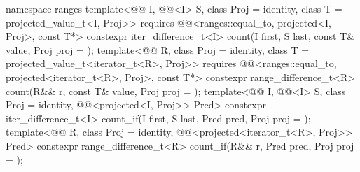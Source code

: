 \begin{codeblock}
{  namespace ranges {
    template<@@ I, @@<I> S, class Proj = identity,
             class T = projected_value_t<I, Proj>>
      requires @@<ranges::equal_to, projected<I, Proj>, const T*>
      constexpr iter_difference_t<I>
        count(I first, S last, const T& value, Proj proj = {});
    template<@@ R, class Proj = identity,
             class T = projected_value_t<iterator_t<R>, Proj>>
      requires @@<ranges::equal_to,
                                         projected<iterator_t<R>, Proj>, const T*>
      constexpr range_difference_t<R>
        count(R&& r, const T& value, Proj proj = {});
    template<@@ I, @@<I> S, class Proj = identity,
             @@<projected<I, Proj>> Pred>
      constexpr iter_difference_t<I>
        count_if(I first, S last, Pred pred, Proj proj = {});
    template<@@ R, class Proj = identity,
             @@<projected<iterator_t<R>, Proj>> Pred>
      constexpr range_difference_t<R>
        count_if(R&& r, Pred pred, Proj proj = {});
  }

}
\end{codeblock}
